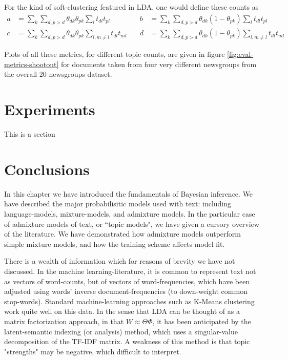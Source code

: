 For the kind of soft-clustering featured in LDA, one would define these counts as
\begin{equation}
\begin{aligned}
a & = \sum_k \sum_{d, {p>d}} \theta_{dk} \theta_{pk} \sum_l t_{dl}t_{pl} & \quad
b & = \sum_k \sum_{d, {p>d}} \theta_{dk} (1 -\theta_{pk}) \sum_l t_{dl}t_{pl}\\
c & = \sum_k \sum_{d, {p>d}} \theta_{dk} \theta_{pk} \sum_{l,m \neq l} t_{dl}t_{ml} & \quad
d & = \sum_k \sum_{d, {p>d}} \theta_{dk} (1- \theta_{pk}) \sum_{l,m \neq l} t_{dl}t_{ml}
\end{aligned}
\end{equation}

Plots of all these metrics, for different topic counts, are given in figure \ref{fig:eval-metrics-shootout} for documents taken from four very different newsgroups from the overall 20-newsgroups dataset.

\section{Experiments}
\label{sec:chap1:experiments}
This is a section

\section{Conclusions}
In this chapter we have introduced the fundamentals of Bayesian inference. We have described the major probabilisitic models used with text: including language-models, mixture-models, and admixture models. In the particular case of admixture models of text, or ``topic models", we have given a cursory overview of the literature. We have demonstrated how admixture models outperform simple mixture models, and how the training scheme affects model fit. 


There is a wealth of information which for reasons of brevity we have not discussed. In the machine learning-literature, it is common to represent text not as vectors of word-counts, but of vectors of word-frequencies, which have been adjusted using words' inverse document-frequencies (to down-weight common stop-words). Standard machine-learning approaches such as K-Means clustering work quite well on this data. In the sense that LDA can be thought of as a matrix factorization approach, in that $W \approx \Theta \Phi$, it has been anticipated by the latent-semantic indexing (or analysis) method, which uses a singular-value decomposition of the TF-IDF matrix. A weakness of this method is that topic "strengths" may be negative, which difficult to interpret. 

